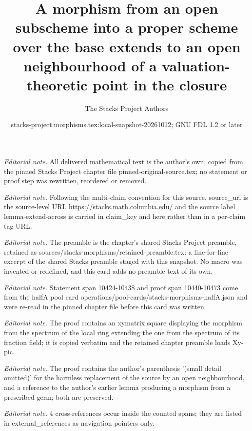 \documentclass[10pt,a4paper]{amsart}
\title{A morphism from an open subscheme into a proper scheme over the base extends to an open neighbourhood of a valuation-theoretic point in the closure}
\author{The Stacks Project Authors}
\date{stacks-project:morphisms.tex:local-snapshot-20261012; GNU FDL 1.2 or later}
\theoremstyle{plain}
\theoremstyle{definition}
\theoremstyle{remark}
\numberwithin{equation}{subsection}
\begin{document}
\maketitle
\noindent\textit{Editorial note.} All delivered mathematical text is the author's own, copied from the pinned Stacks Project chapter file pinned-original-source.tex; no statement or proof step was rewritten, reordered or removed.\par\medskip
\noindent\textit{Editorial note.} Following the multi-claim convention for this source, source\_url is the source-level URL https://stacks.math.columbia.edu/ and the source label lemma-extend-across is carried in claim\_key and here rather than in a per-claim tag URL.\par\medskip
\noindent\textit{Editorial note.} The preamble is the chapter's shared Stacks Project preamble, retained as sources/stacks-morphisms/retained-preamble.tex: a line-for-line excerpt of the shared Stacks preamble staged with this snapshot. No macro was invented or redefined, and this card adds no preamble text of its own.\par\medskip
\noindent\textit{Editorial note.} Statement span 10424-10438 and proof span 10440-10473 come from the halfA pool card operations/pool-cards/stacks-morphisms-halfA.json and were re-read in the pinned chapter file before this card was written.\par\medskip
\noindent\textit{Editorial note.} The proof contains an xymatrix square displaying the morphism from the spectrum of the local ring extending the one from the spectrum of its fraction field; it is copied verbatim and the retained chapter preamble loads Xy-pic.\par\medskip
\noindent\textit{Editorial note.} The proof contains the author's parenthesis '(small detail omitted)' for the harmless replacement of the source by an open neighbourhood, and a reference to the author's earlier lemma producing a morphism from a prescribed germ; both are preserved.\par\medskip
\noindent\textit{Editorial note.} 4 cross-references occur inside the counted spans; they are listed in external\_references as navigation pointers only.\par\medskip
\end{document}
